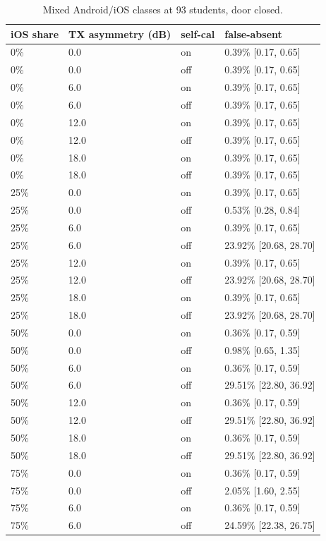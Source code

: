 \begin{table}[t]
\centering
\caption{Mixed Android/iOS classes at 93 students, door closed.}\label{tab:e04}
\begin{tabular}{llll}
\toprule
iOS share & TX asymmetry (dB) & self-cal & false-absent \\
\midrule
0\% & 0.0 & on & 0.39\% [0.17, 0.65] \\
0\% & 0.0 & off & 0.39\% [0.17, 0.65] \\
0\% & 6.0 & on & 0.39\% [0.17, 0.65] \\
0\% & 6.0 & off & 0.39\% [0.17, 0.65] \\
0\% & 12.0 & on & 0.39\% [0.17, 0.65] \\
0\% & 12.0 & off & 0.39\% [0.17, 0.65] \\
0\% & 18.0 & on & 0.39\% [0.17, 0.65] \\
0\% & 18.0 & off & 0.39\% [0.17, 0.65] \\
25\% & 0.0 & on & 0.39\% [0.17, 0.65] \\
25\% & 0.0 & off & 0.53\% [0.28, 0.84] \\
25\% & 6.0 & on & 0.39\% [0.17, 0.65] \\
25\% & 6.0 & off & 23.92\% [20.68, 28.70] \\
25\% & 12.0 & on & 0.39\% [0.17, 0.65] \\
25\% & 12.0 & off & 23.92\% [20.68, 28.70] \\
25\% & 18.0 & on & 0.39\% [0.17, 0.65] \\
25\% & 18.0 & off & 23.92\% [20.68, 28.70] \\
50\% & 0.0 & on & 0.36\% [0.17, 0.59] \\
50\% & 0.0 & off & 0.98\% [0.65, 1.35] \\
50\% & 6.0 & on & 0.36\% [0.17, 0.59] \\
50\% & 6.0 & off & 29.51\% [22.80, 36.92] \\
50\% & 12.0 & on & 0.36\% [0.17, 0.59] \\
50\% & 12.0 & off & 29.51\% [22.80, 36.92] \\
50\% & 18.0 & on & 0.36\% [0.17, 0.59] \\
50\% & 18.0 & off & 29.51\% [22.80, 36.92] \\
75\% & 0.0 & on & 0.36\% [0.17, 0.59] \\
75\% & 0.0 & off & 2.05\% [1.60, 2.55] \\
75\% & 6.0 & on & 0.36\% [0.17, 0.59] \\
75\% & 6.0 & off & 24.59\% [22.38, 26.75] \\

\end{tabular}
\end{table}
